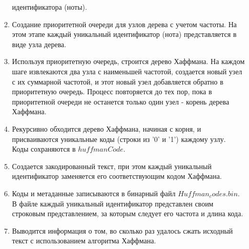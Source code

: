 \documentclass[12pt, a4paper]{article}
\begin{document}
\begin{enumerate}
\begin{enumerate}
			идентификатора (ноты).
			\item Создание приоритетной очереди для узлов дерева с учетом 
			частоты. На этом этапе каждый уникальный идентификатор (нота) 
			представляется в виде узла дерева.
			\item Используя приоритетную очередь, строится дерево Хаффмана. На 
			каждом шаге извлекаются два узла с наименьшей частотой, создается 
			новый узел с их суммарной частотой, и этот новый узел добавляется 
			обратно в приоритетную очередь. Процесс повторяется до тех пор, пока 
			в приоритетной очереди не останется только один узел - корень дерева 
			Хаффмана.
			\item Рекурсивно обходится дерево Хаффмана, начиная с корня, и 
			присваиваются уникальные коды (строки из '0' и '1') каждому узлу.\\
			Коды сохраняются в $huffmanCode$.
			\item Создается закодированный текст, при этом каждый уникальный 
			идентификатор заменяется его соответствующим кодом Хаффмана.
			\item Коды и метаданные записываются в бинарный файл 
			$Huffman_codes.bin$. В файле каждый уникальный идентификатор 
			представлен своим строковым представлением, за которым следует его 
			частота и длина кода.
			\item Выводится информация о том, во сколько раз удалось сжать 
			исходный текст с использованием алгоритма Хаффмана.
		\end{enumerate}
\end{enumerate}
\newpage
\end{document}
